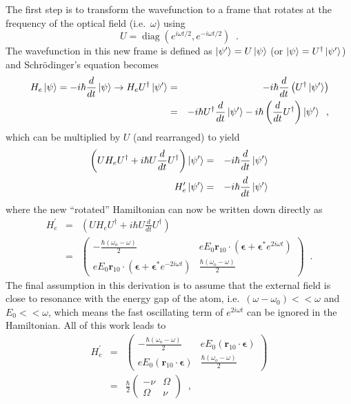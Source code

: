 The first step is to transform the wavefunction to a frame that rotates at the frequency of the optical field (i.e.\ $\omega$) using
$$
U = \operatorname{diag}\left(e^{i\omega t/2},e^{-i\omega t/2}\right)\;\;.
$$
The wavefunction in this new frame is defined as $\left|\psi^\prime\right\rangle=U\left|\psi\right\rangle$ (or $\left|\psi\right\rangle=U^\dagger \left|\psi^\prime\right\rangle$) and Schr\"{o}dinger's equation becomes
\begin{eqnarray*}
H_e \left|\psi\right\rangle = -i\hbar\frac{d}{dt}\left|\psi\right\rangle\rightarrow H_e U^\dagger\left|\psi^\prime\right\rangle &=& -i\hbar\frac{d}{dt}\left(U^\dagger \left|\psi^\prime\right\rangle\right)\\
&=& -i\hbar U^\dagger \frac{d}{dt}\left|\psi^\prime\right\rangle-i\hbar\left(\frac{d}{dt}U^\dagger\right)\left|\psi^\prime\right\rangle\;\;,
\end{eqnarray*}
which can be multiplied by $U$ (and rearranged) to yield
\begin{eqnarray*}
\left(UH_eU^\dagger+i\hbar U\frac{d}{dt}U^\dagger\right)\left|\psi^\prime\right\rangle&=&-i\hbar\frac{d}{dt}\left|\psi^\prime\right\rangle\\
H_e^\prime \left|\psi^\prime\right\rangle &=& -i\hbar\frac{d}{dt}\left|\psi^\prime\right\rangle
\end{eqnarray*}
where the new ``rotated'' Hamiltonian can now be written down directly as
\begin{eqnarray*}
H_e^\prime &=& \left(UH_eU^\dagger+i\hbar U\frac{d}{dt}U^\dagger\right)\\
&=& \begin{pmatrix}
-\frac{\hbar(\omega_o-\omega)}{2} & e E_0\mathbf{r}_{10}\cdot\left(\mathbf{\epsilon}+\mathbf{\epsilon}^*e^{2i\omega t}\right)\\
e E_0\mathbf{r}_{10}\cdot\left(\mathbf{\epsilon}+\mathbf{\epsilon}^*e^{-2i\omega t} \right)& \frac{\hbar(\omega_o-\omega)}{2}
\end{pmatrix}\;\;.
\end{eqnarray*}
The final assumption in this derivation is to assume that the external field is close to resonance with the energy gap of the atom, i.e.\ $(\omega-\omega_0)<<\omega$ and $E_0<<\omega$, which means the fast oscillating term of $e^{2i\omega t}$ can be ignored in the Hamiltonian.  All of this work leads to 
\begin{eqnarray*}
H_e^\prime &=& \begin{pmatrix}
-\frac{\hbar(\omega_o-\omega)}{2} & e E_0\left(\mathbf{r}_{10}\cdot\mathbf{\epsilon}\right)\\
e E_0\left(\mathbf{r}_{10}\cdot\mathbf{\epsilon}\right)& \frac{\hbar(\omega_o-\omega)}{2}
\end{pmatrix}\\
&=& \frac{\hbar}{2}\begin{pmatrix}
-\nu & \Omega\\
\Omega & \nu
\end{pmatrix}\;\;,
\end{eqnarray*}
